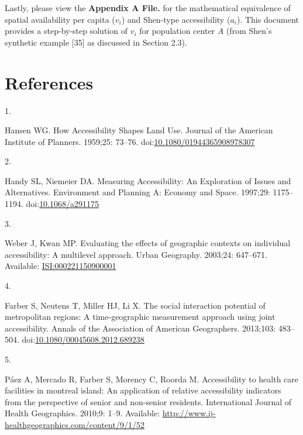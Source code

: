 \documentclass[10pt,letterpaper]{article}
\newlength{\cslhangindent}
\newlength{\csllabelwidth}
\newlength{\cslentryspacingunit} %
\newenvironment{CSLReferences}[2] %
 {%
  \setlength{\parindent}{0pt}
  \ifodd #1
  \let\oldpar\par
  \def\par{\hangindent=\cslhangindent\oldpar}
  \fi
  \setlength{\parskip}{#2\cslentryspacingunit}
 }%
 {}
\newcommand{\CSLLeftMargin}[1]{\parbox[t]{\csllabelwidth}{#1}}
\newcommand{\CSLRightInline}[1]{\parbox[t]{\linewidth - \csllabelwidth}{#1}\break}
\begin{document}
Lastly, please view the \textbf{Appendix A File.} for the mathematical
equivalence of spatial availability per capita (\(v_i\)) and Shen-type
accessibility (\(a_i\)). This document provides a step-by-step solution
of \(v_i\) for population center \(A\) (from Shen's synthetic example
{[}35{]} as discussed in Section 2.3).

\section{References}

\hypertarget{refs}{}
\begin{CSLReferences}{0}{0}
\leavevmode{}%
\CSLLeftMargin{1. }%
\CSLRightInline{Hansen WG. How Accessibility Shapes Land Use. Journal of
the American Institute of Planners. 1959;25: 73--76.
doi:\href{https://doi.org/10.1080/01944365908978307}{10.1080/01944365908978307}}

\leavevmode{}%
\CSLLeftMargin{2. }%
\CSLRightInline{Handy SL, Niemeier DA. Measuring {Accessibility}: {An}
{Exploration} of {Issues} and {Alternatives}. Environment and Planning
A: Economy and Space. 1997;29: 1175--1194.
doi:\href{https://doi.org/10.1068/a291175}{10.1068/a291175}}

\leavevmode{}%
\CSLLeftMargin{3. }%
\CSLRightInline{Weber J, Kwan MP. Evaluating the effects of geographic
contexts on individual accessibility: A multilevel approach. Urban
Geography. 2003;24: 647--671. Available:
\href{https://ISI:000221150900001}{ISI:000221150900001}}

\leavevmode{}%
\CSLLeftMargin{4. }%
\CSLRightInline{Farber S, Neutens T, Miller HJ, Li X. The social
interaction potential of metropolitan regions: A time-geographic
measurement approach using joint accessibility. Annals of the
Association of American Geographers. 2013;103: 483--504.
doi:\href{https://doi.org/10.1080/00045608.2012.689238}{10.1080/00045608.2012.689238}}

\leavevmode{}%
\CSLLeftMargin{5. }%
\CSLRightInline{Páez A, Mercado R, Farber S, Morency C, Roorda M.
Accessibility to health care facilities in montreal island: An
application of relative accessibility indicators from the perspective of
senior and non-senior residents. International Journal of Health
Geographics. 2010;9: 1--9. Available:
\url{http://www.ij-healthgeographics.com/content/9/1/52}}


\end{CSLReferences}
\end{document}
